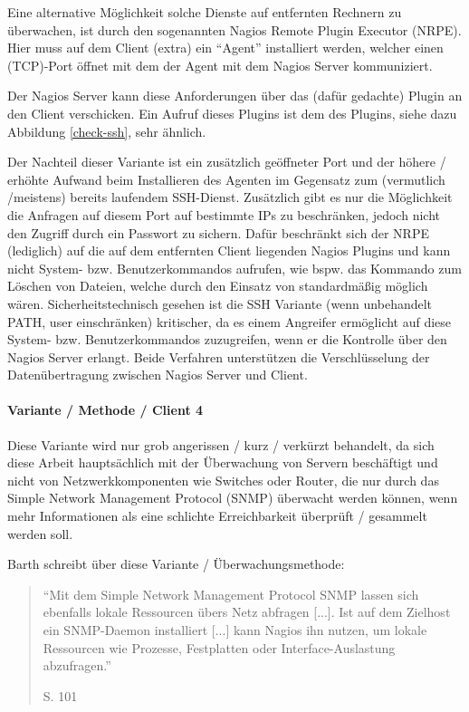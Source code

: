 Eine alternative Möglichkeit solche Dienste auf entfernten Rechnern zu überwachen, ist durch den sogenannten Nagios Remote Plugin Executor (\gls{NRPE}).
Hier muss auf dem Client (extra) ein "`Agent"' installiert werden, welcher einen (TCP)-Port öffnet mit dem der Agent mit dem Nagios Server kommuniziert.

Der Nagios Server kann diese Anforderungen über das (dafür gedachte) Plugin  an den Client verschicken.
Ein Aufruf dieses Plugins ist dem des  Plugins, siehe dazu Abbildung \ref{check-ssh}, sehr ähnlich.

Der Nachteil dieser Variante ist ein zusätzlich geöffneter Port und der höhere / erhöhte Aufwand beim Installieren des Agenten im Gegensatz zum (vermutlich /meistens) bereits laufendem SSH-Dienst.
Zusätzlich gibt es nur die Möglichkeit die Anfragen auf diesem Port auf bestimmte IPs zu beschränken, jedoch nicht den Zugriff durch ein Passwort zu sichern.
Dafür beschränkt sich der NRPE (lediglich) auf die auf dem entfernten Client liegenden Nagios Plugins und kann nicht System- bzw. Benutzerkommandos aufrufen, wie bspw. das  Kommando zum Löschen von Dateien, welche durch den Einsatz von  standardmäßig möglich wären.
Sicherheitstechnisch gesehen ist die SSH Variante (wenn unbehandelt PATH, user einschränken) kritischer, da es einem Angreifer ermöglicht auf diese System- bzw. Benutzerkommandos zuzugreifen, wenn er die Kontrolle über den Nagios Server erlangt.
Beide Verfahren unterstützen die Verschlüsselung der Datenübertragung zwischen Nagios Server und Client.

\paragraph{Variante / Methode / Client 4}
Diese Variante wird nur grob angerissen / kurz / verkürzt behandelt, da sich diese Arbeit hauptsächlich mit der Überwachung von Servern beschäftigt und nicht von Netzwerkkomponenten wie Switches oder Router, die nur durch das Simple Network Management Protocol (\gls{SNMP}) überwacht werden können, wenn mehr Informationen als eine schlichte Erreichbarkeit überprüft / gesammelt werden soll.

Barth schreibt über diese Variante / Überwachungsmethode:
\begin{quote}"`Mit dem Simple Network Management Protocol SNMP lassen sich ebenfalls lokale Ressourcen übers Netz abfragen [...]. Ist auf dem Zielhost ein SNMP-Daemon installiert [...] kann Nagios ihn nutzen, um lokale Ressourcen wie Prozesse, Festplatten oder Interface-Auslastung abzufragen."' \begin{flushright}\cite{Barth08} S. 101\end{flushright}\end{quote} 


